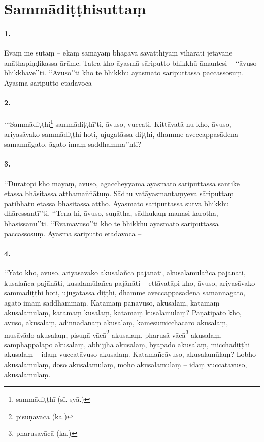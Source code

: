 \section{Sammādiṭṭhisuttaṃ}

\paragraph{1.} Evaṃ me sutaṃ – ekaṃ samayaṃ bhagavā sāvatthiyaṃ viharati jetavane anāthapiṇḍikassa ārāme. Tatra kho āyasmā sāriputto bhikkhū āmantesi – ‘‘āvuso bhikkhave’’ti. ‘‘Āvuso’’ti kho te bhikkhū āyasmato sāriputtassa paccassosuṃ. Āyasmā sāriputto etadavoca –

\paragraph{2.} ‘‘‘Sammādiṭṭhi\footnote{sammādiṭṭhī (sī. syā.)} sammādiṭṭhī’ti, āvuso, vuccati. Kittāvatā nu kho, āvuso, ariyasāvako sammādiṭṭhi hoti, ujugatāssa diṭṭhi, dhamme aveccappasādena samannāgato, āgato imaṃ saddhamma’’nti?

\paragraph{3.} ‘‘Dūratopi kho mayaṃ, āvuso, āgaccheyyāma āyasmato sāriputtassa santike etassa bhāsitassa atthamaññātuṃ. Sādhu vatāyasmantaṃyeva sāriputtaṃ paṭibhātu etassa bhāsitassa attho. Āyasmato sāriputtassa sutvā bhikkhū dhāressantī’’ti. ‘‘Tena hi, āvuso, suṇātha, sādhukaṃ manasi karotha, bhāsissāmī’’ti. ‘‘Evamāvuso’’ti kho te bhikkhū āyasmato sāriputtassa paccassosuṃ. Āyasmā sāriputto etadavoca –

\paragraph{4.} ‘‘Yato kho, āvuso, ariyasāvako akusalañca pajānāti, akusalamūlañca pajānāti, kusalañca pajānāti, kusalamūlañca pajānāti – ettāvatāpi kho, āvuso, ariyasāvako sammādiṭṭhi hoti, ujugatāssa diṭṭhi, dhamme aveccappasādena samannāgato, āgato imaṃ saddhammaṃ. Katamaṃ panāvuso, akusalaṃ, katamaṃ akusalamūlaṃ, katamaṃ kusalaṃ, katamaṃ kusalamūlaṃ? Pāṇātipāto kho, āvuso, akusalaṃ, adinnādānaṃ akusalaṃ, kāmesumicchācāro akusalaṃ, musāvādo akusalaṃ, pisuṇā vācā\footnote{pisuṇavācā (ka.)} akusalaṃ, pharusā vācā\footnote{pharusavācā (ka.)} akusalaṃ, samphappalāpo akusalaṃ, abhijjhā akusalaṃ, byāpādo akusalaṃ, micchādiṭṭhi akusalaṃ – idaṃ vuccatāvuso akusalaṃ. Katamañcāvuso, akusalamūlaṃ? Lobho akusalamūlaṃ, doso akusalamūlaṃ, moho akusalamūlaṃ – idaṃ vuccatāvuso, akusalamūlaṃ.

